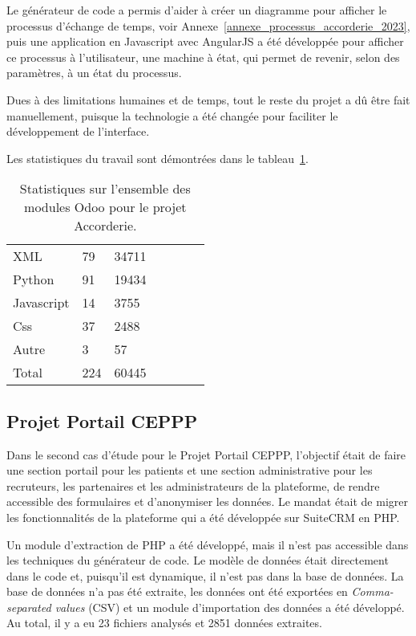 Le générateur de code a permis d’aider à créer un diagramme pour afficher le processus d’échange de temps, voir Annexe~\ref{annexe_processus_accorderie_2023}, puis une application en Javascript avec AngularJS a été développée pour afficher ce processus à l’utilisateur, une machine à état, qui permet de revenir, selon des paramètres, à un état du processus.

Dues à des limitations humaines et de temps, tout le reste du projet a dû être fait manuellement, puisque la technologie a été changée pour faciliter le développement de l’interface.

Les statistiques du travail sont démontrées dans le tableau~\ref{tab:stat_code_accorderie}.


\begin{table}[htb]
\caption{Statistiques sur l'ensemble des modules Odoo pour le projet Accorderie.}
\centering
\begin{tabular}{|l|l|l|l|l|l|l|}

\hline
\cellcolor[HTML]{d9d9d9}{\textbf{Langage}} & \cellcolor[HTML]{d9d9d9}{\textbf{Fichiers}} & \cellcolor[HTML]{d9d9d9}{\textbf{Code}}\\\hline

XML & 79 & 34711\\\hline
Python & 91 & 19434\\\hline
Javascript & 14 & 3755\\\hline
Css & 37 & 2488\\\hline
Autre & 3 & 57\\\hline
Total & 224 & 60445\\\hline

\end{tabular}
\label{tab:stat_code_accorderie}
\end{table}

\subsection{Projet Portail CEPPP}

Dans le second cas d'étude pour le Projet Portail CEPPP, l'objectif était de faire une section portail pour les patients et une section administrative pour les recruteurs, les partenaires et les administrateurs de la plateforme, de rendre accessible des formulaires et d'anonymiser les données. Le mandat était de migrer les fonctionnalités de la plateforme qui a été développée sur SuiteCRM en PHP.

Un module d'extraction de PHP a été développé, mais il n'est pas accessible dans les techniques du générateur de code. Le modèle de données était directement dans le code et, puisqu'il est dynamique, il n'est pas dans la base de données. La base de données n'a pas été extraite, les données ont été exportées en \textit{Comma-separated values} (CSV) et un module d'importation des données a été développé. Au total, il y a eu 23 fichiers analysés et 2851 données extraites.

